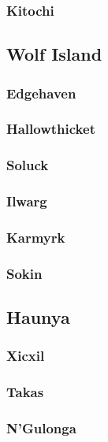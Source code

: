 		\subsubsection{Kitochi}

	\subsection{Wolf Island}

		\subsubsection{Edgehaven}

		\subsubsection{Hallowthicket}

		\subsubsection{Soluck}

		\subsubsection{Ilwarg}

		\subsubsection{Karmyrk}

		\subsubsection{Sokin}

	\subsection{Haunya}

		\subsubsection{Xicxil}
	
		\subsubsection{Takas}
	
		\subsubsection{N'Gulonga}

